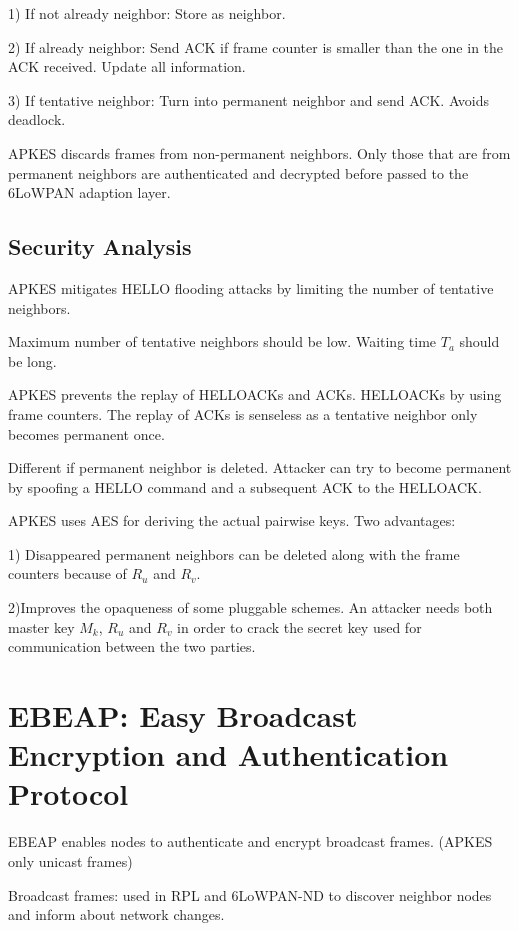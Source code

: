 \documentclass[10pt]{article}
\begin{document}
1) If not already neighbor: Store as neighbor.

2) If already neighbor: Send ACK if frame counter is smaller than the one in the ACK received. Update all information.

3) If tentative neighbor: Turn into permanent neighbor and send ACK. Avoids deadlock.


APKES discards frames from non-permanent neighbors. Only those that are from permanent neighbors are authenticated and decrypted before passed to the 6LoWPAN adaption layer.



\subsection{Security Analysis}

\noindent

APKES mitigates HELLO flooding attacks by limiting the number of tentative neighbors. 

Maximum number of tentative neighbors should be low. Waiting time $T_a$ should be long.

APKES prevents the replay of HELLOACKs and ACKs. HELLOACKs by using frame counters. The replay of ACKs is senseless as a tentative neighbor only becomes permanent once.

Different if permanent neighbor is deleted. Attacker can try to become permanent by spoofing a HELLO command and a subsequent ACK to the HELLOACK.

APKES uses AES for deriving the actual pairwise keys. Two advantages:

1) Disappeared permanent neighbors can be deleted along with the frame counters because of $R_u$ and $R_v$.

2)Improves the opaqueness of some pluggable schemes. An attacker needs both master key $M_k$, $R_u$ and $R_v$ in order to crack the secret key used for communication between the two parties.



\section{EBEAP: Easy Broadcast Encryption and Authentication Protocol}

\noindent

EBEAP enables nodes to authenticate and encrypt broadcast frames. (APKES only unicast frames)

Broadcast frames: used in RPL and 6LoWPAN-ND to discover neighbor nodes and inform about network changes.
\end{document}
